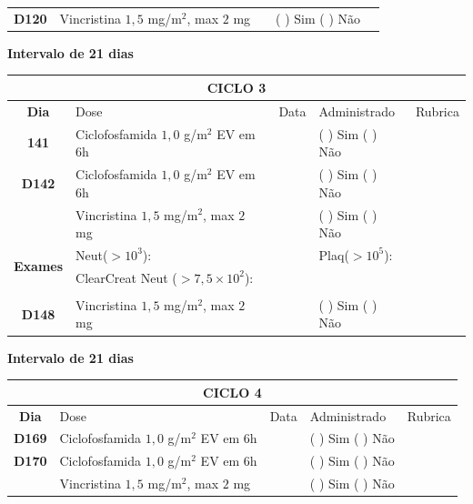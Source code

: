 \documentclass[11pt,a4paper,oldfontcommands]{memoir}
\begin{document}
\begin{center}
\begin{longtable}{p{1cm}p{5cm}|p{1cm}|p{4cm}|p{2.5cm}}
    \hline
    \\
    \hline
    \multicolumn{1}{c|}{\multirow{1}{*}{\textbf{D120}}}&{Vincristina \(1,5\) mg/m\(^2\), max \(2\) mg}&&{(  ) Sim (  ) Não}&\\
    \hline
\end{longtable}
\textbf{Intervalo de 21 dias}
    \begin{longtable}{p{1cm}p{5cm}|p{1cm}|p{4cm}|p{2.5cm}}
    \hline
	\multicolumn{5}{c}{\textbf{CICLO 3}}\\
	\hline
    \multicolumn{1}{c|}{\multirow{1}{*}{\textbf{Dia}}}&{Dose}&{Data}&{Administrado}&{Rubrica} \\
    \hline
    \multicolumn{1}{c|}{\multirow{1}{*}{\textbf{141}}}&{Ciclofosfamida \(1,0\) g/m\(^2\) EV em 6h}&&{(  ) Sim (  ) Não}&\\
    \multicolumn{1}{c|}{\multirow{1}{*}{\textbf{D142}}}&{Ciclofosfamida \(1,0\) g/m\(^2\) EV em 6h}&&{(  ) Sim (  ) Não}&\\
    \multicolumn{1}{c|}{\multirow{1}{*}{\textbf{}}}&{Vincristina \(1,5\) mg/m\(^2\), max \(2\) mg}&&{(  ) Sim (  ) Não}&\\
    \hline
    \multicolumn{1}{c|}{\multirow{2}{*}{\textbf{Exames}}}&\multicolumn{2}{l|}{Neut(\(>10^3\)):}&{Plaq(\(>10^5\)):}&\\
    \cline{2-5}
    \multicolumn{1}{c|}{\multirow{2}{*}{{}}}&\multicolumn{2}{l|}{ClearCreat Neut (\(>7,5\times10^2\)):}&{}&{}\\
    \hline
    \\
    \hline
    \multicolumn{1}{c|}{\multirow{1}{*}{\textbf{D148}}}&{Vincristina \(1,5\) mg/m\(^2\), max \(2\) mg}&&{(  ) Sim (  ) Não}&\\
    \hline
\end{longtable}
\textbf{Intervalo de 21 dias}
\    \begin{longtable}{p{1cm}p{5cm}|p{1cm}|p{4cm}|p{2.5cm}}
    \hline
	\multicolumn{5}{c}{\textbf{CICLO 4}}\\
	\hline
    \multicolumn{1}{c|}{\multirow{1}{*}{\textbf{Dia}}}&{Dose}&{Data}&{Administrado}&{Rubrica} \\
    \hline
    \multicolumn{1}{c|}{\multirow{1}{*}{\textbf{D169}}}&{Ciclofosfamida \(1,0\) g/m\(^2\) EV em 6h}&&{(  ) Sim (  ) Não}&\\
    \multicolumn{1}{c|}{\multirow{1}{*}{\textbf{D170}}}&{Ciclofosfamida \(1,0\) g/m\(^2\) EV em 6h}&&{(  ) Sim (  ) Não}&\\
    \multicolumn{1}{c|}{\multirow{1}{*}{\textbf{}}}&{Vincristina \(1,5\) mg/m\(^2\), max \(2\) mg}&&{(  ) Sim (  ) Não}&\\

\end{longtable}
\end{center}
\end{document}
